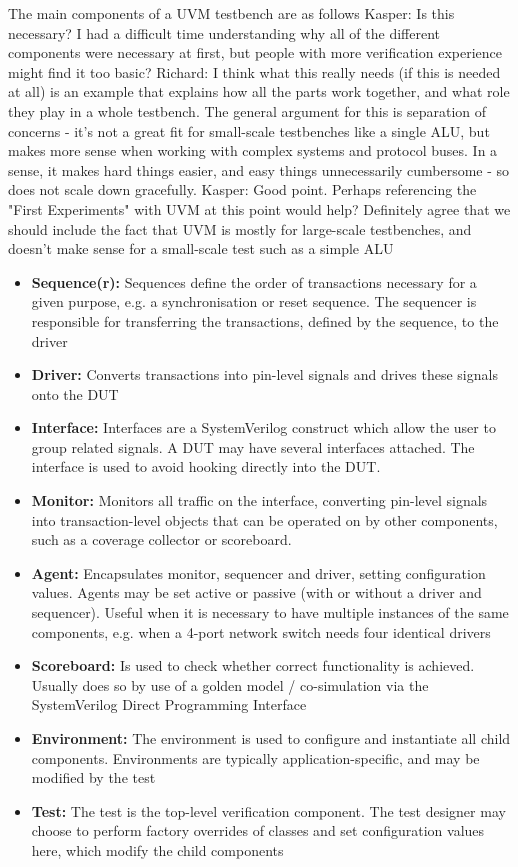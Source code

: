 \documentclass[conference]{IEEEtran}
\newcommand{\ducky}[1]{{\color{orange} Richard: #1}}
\newcommand{\kasper}[1]{{\color{purple} Kasper: #1}}
\begin{document}
The main components of a UVM testbench are as follows
\kasper{Is this necessary? I had a difficult time understanding why all of the different components were necessary at first, but people with more verification experience might find it too basic?}
\ducky{I think what this really needs (if this is needed at all) is an example that explains how all the parts work together, and what role they play in a whole testbench. The general argument for this is separation of concerns - it's not a great fit for small-scale testbenches like a single ALU, but makes more sense when working with complex systems and protocol buses. In a sense, it makes hard things easier, and easy things unnecessarily cumbersome - so does not scale down gracefully.}
\kasper{Good point. Perhaps referencing the "First Experiments" with UVM at this point would help? Definitely agree that we should include the fact that UVM is mostly for large-scale testbenches, and doesn't make sense for a small-scale test such as a simple ALU}
\begin{itemize}
    \item \textbf{Sequence(r):} Sequences define the order of transactions necessary for a given purpose, e.g. a synchronisation or reset sequence. The sequencer is responsible for transferring the transactions, defined by the sequence, to the driver
    \item \textbf{Driver:} Converts transactions into pin-level signals and drives these signals onto the DUT
    \item \textbf{Interface:} Interfaces are a SystemVerilog construct which allow the user to group related signals. A DUT may have several interfaces attached. The interface is used to avoid hooking directly into the DUT. 
    \item \textbf{Monitor:} Monitors all traffic on the interface, converting pin-level signals into transaction-level objects that can be operated on by other components, such as a coverage collector or scoreboard. 
    \item \textbf{Agent:} Encapsulates monitor, sequencer and driver, setting configuration values. Agents may be set active or passive (with or without a driver and sequencer). Useful when it is necessary to have multiple instances of the same components, e.g. when a 4-port network switch needs four identical drivers
    \item \textbf{Scoreboard:} Is used to check whether correct functionality is achieved. Usually does so by use of a golden model / co-simulation via the SystemVerilog Direct Programming Interface
    \item \textbf{Environment:} The environment is used to configure and instantiate all child components. Environments are typically application-specific, and may be modified by the test
    \item \textbf{Test:} The test is the top-level verification component. The test designer may choose to perform factory overrides of classes and set configuration values here, which modify the child components
\end{itemize}
\end{document}
